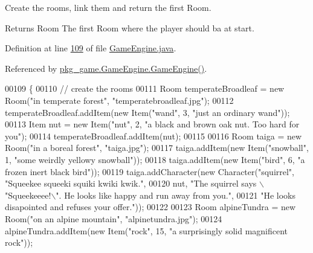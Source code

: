 Create the rooms, link them and return the first Room. 

\begin{DoxyReturn}{Returns}
Room The first Room where the player should ba at start. 
\end{DoxyReturn}


Definition at line \hyperlink{GameEngine_8java_source_l00109}{109} of file \hyperlink{GameEngine_8java_source}{Game\-Engine.\-java}.



Referenced by \hyperlink{GameEngine_8java_source_l00070}{pkg\-\_\-game.\-Game\-Engine.\-Game\-Engine()}.


\begin{DoxyCode}
00109                                \{
00110         \textcolor{comment}{// create the rooms}
00111         Room temperateBroadleaf = \textcolor{keyword}{new} Room(\textcolor{stringliteral}{"in temperate forest"}, \textcolor{stringliteral}{"temperatebroadleaf.jpg"});
00112         temperateBroadleaf.addItem(\textcolor{keyword}{new} Item(\textcolor{stringliteral}{"wand"}, 3, \textcolor{stringliteral}{"just an ordinary wand"}));
00113         Item nut = \textcolor{keyword}{new} Item(\textcolor{stringliteral}{"nut"}, 2, \textcolor{stringliteral}{"a black and brown oak nut. Too hard for you"});
00114         temperateBroadleaf.addItem(nut);
00115 
00116         Room taiga = \textcolor{keyword}{new} Room(\textcolor{stringliteral}{"in a boreal forest"}, \textcolor{stringliteral}{"taiga.jpg"});
00117         taiga.addItem(\textcolor{keyword}{new} Item(\textcolor{stringliteral}{"snowball"}, 1, \textcolor{stringliteral}{"some weirdly yellowy snowball"}));
00118         taiga.addItem(\textcolor{keyword}{new} Item(\textcolor{stringliteral}{"bird"}, 6, \textcolor{stringliteral}{"a frozen inert black bird"}));
00119         taiga.addCharacter(\textcolor{keyword}{new} Character(\textcolor{stringliteral}{"squirrel"}, \textcolor{stringliteral}{"Squeekee squeeki squiki kwiki kwik."},
00120                 nut, \textcolor{stringliteral}{"The squirrel says \(\backslash\)"Squeekeeee!\(\backslash\)". He looks like happy and run away from you."},
00121                 \textcolor{stringliteral}{"He looks disapointed and refuses your offer."}));
00122 
00123         Room alpineTundra = \textcolor{keyword}{new} Room(\textcolor{stringliteral}{"on an alpine mountain"}, \textcolor{stringliteral}{"alpinetundra.jpg"});
00124         alpineTundra.addItem(\textcolor{keyword}{new} Item(\textcolor{stringliteral}{"rock"}, 15, \textcolor{stringliteral}{"a surprisingly solid magnificent rock"}));

\end{DoxyCode}
